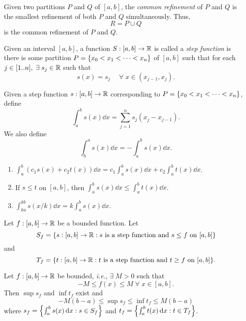 \documentclass[12pt]{article}
\begin{document}
\begin{defn} \label{defn:common refinement}
    Given two partitions $P$ and $Q$ of $[a, b]$, the \emph{common refinement} of $P$ and $Q$ is the smallest refinement of both $P$ and $Q$ simultaneously. Thus, \[
        R = P \cup Q
    \] is the common refinement of $P$ and $Q$.
\end{defn}

\begin{defn} \label{defn:step fn}
    Given an interval $[a, b]$, a function $S : [a, b] \to \mathbb{R}$ is called a \emph{step function} is there is some partition $P = \set{x_{0} < x_{1} < \dots < x_{n}}$ of $[a, b]$ such that for each $j \in [1 .. n], \;\exists\; s_{j} \in \mathbb{R}$ such that \[
        s(x) = s_{j} \quad \;\forall\; x \in (x_{j-1}, x_{j}).
    \]
\end{defn}

\begin{defn} \label{defn:step int}
    Given a step function $s : [a, b] \to \mathbb{R}$ corresponding to $P = \set{x_{0} < x_{1} < \dots < x_{n}}$, define \[
        \int_{a}^{b} s(x) \dd x = \sum_{j=1}^{n} s_{j} (x_{j} - x_{j-1}).
\] We also define \[
    \int_{b}^{a} s(x) \dd x = - \int_{a}^{b} s(x) \dd x.
\]
\end{defn}

\begin{thm}[Properties] \label{thm:int properties} \hfill
    \begin{enumerate}[label=(\alph*)]
        \item $\int_{a}^{b} (c_{1}s(x) + c_{2}t(x)) \dd x = c_{1} \int_{a}^{b} s(x) \dd x + c_{2} \int_{a}^{b} t(x) \dd x$.
        \item If $s \leq t$ on $[a, b]$, then $\int_{a}^{b} s(x) \dd x \leq \int_{a}^{b} t(x) \dd x$.
        \item $\int_{ka}^{kb} s(x/k) \dd x = k \int_{a}^{b} s(x) \dd x$.
    \end{enumerate}
\end{thm}

\begin{defn}[] \label{defn:}
    Let $f : [a, b] \to \mathbb{R}$ be a bounded function. Let \[
        S_{f} = \set{s : [a, b] \to \R : s \text{ is a step function and } s \leq f \text{ on } [a, b]}
    \] and \[
        T_{f} = \set{t : [a, b] \to \R : t \text{ is a step function and } t \geq f \text{ on } [a, b]}.
    \]
\end{defn}

\begin{lem}[] \label{lem:}
    Let $f : [a, b] \to \mathbb{R}$ be bounded, \textit{i.e.}, $\exists\; M > 0$ such that \[
        -M \leq f(x) \leq M \;\forall\; x \in [a, b].
    \] Then $\sup s_{f}$ and $\inf t_{f}$ exist and \[
        -M (b - a) \leq \sup s_{f} \leq \inf t_{f} \leq M (b - a)
    \] where $s_{f} = \set{\int_{a}^{b}s(x) \dd x : s \in S_{f}}$ and $t_{f} = \set{\int_{a}^{b} t(x) \dd x : t \in T_{f}}$.
\end{lem}
\end{document}
